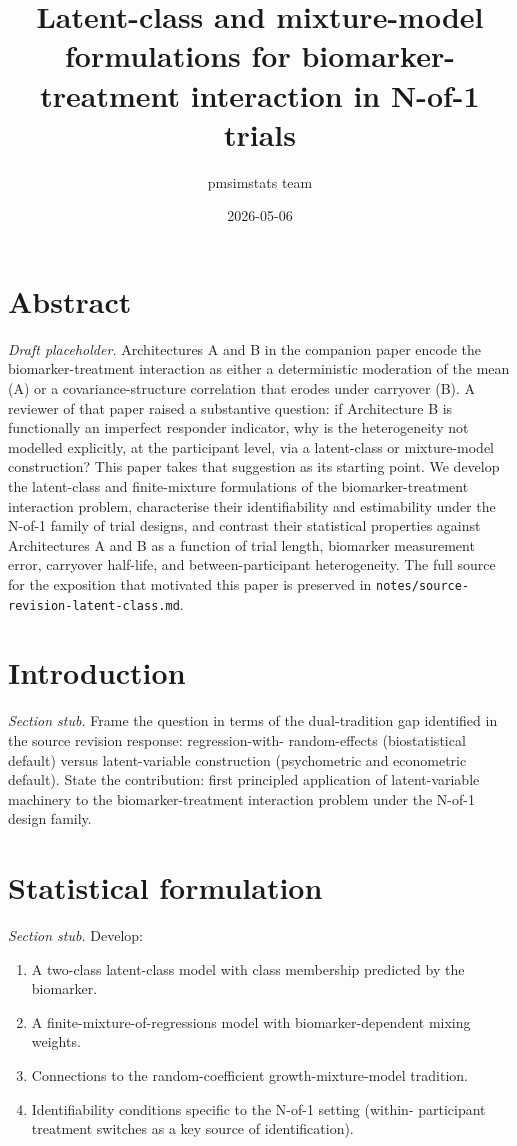 \documentclass[
]{article}
\title{Latent-class and mixture-model formulations for biomarker-treatment interaction in N-of-1 trials}
\author{pmsimstats team}
\date{2026-05-06}
\providecommand{\tightlist}{%
  \setlength{\itemsep}{0pt}\setlength{\parskip}{0pt}}
\begin{document}
\maketitle

\section{Abstract}\label{abstract}

\emph{Draft placeholder.} Architectures A and B in the companion paper
encode the biomarker-treatment interaction as either a deterministic
moderation of the mean (A) or a covariance-structure correlation that
erodes under carryover (B). A reviewer of that paper raised a
substantive question: if Architecture B is functionally an imperfect
responder indicator, why is the heterogeneity not modelled
explicitly, at the participant level, via a latent-class or
mixture-model construction? This paper takes that suggestion as its
starting point. We develop the latent-class and finite-mixture
formulations of the biomarker-treatment interaction problem,
characterise their identifiability and estimability under the
N-of-1 family of trial designs, and contrast their statistical
properties against Architectures A and B as a function of trial
length, biomarker measurement error, carryover half-life, and
between-participant heterogeneity. The full source for the
exposition that motivated this paper is preserved in
\texttt{notes/source-revision-latent-class.md}.

\section{Introduction}\label{introduction}

\emph{Section stub.} Frame the question in terms of the dual-tradition
gap identified in the source revision response: regression-with-
random-effects (biostatistical default) versus latent-variable
construction (psychometric and econometric default). State the
contribution: first principled application of latent-variable
machinery to the biomarker-treatment interaction problem under the
N-of-1 design family.

\section{Statistical formulation}\label{statistical-formulation}

\emph{Section stub.} Develop:

\begin{enumerate}
\def\labelenumi{\arabic{enumi}.}
\tightlist
\item
  A two-class latent-class model with class membership predicted by
  the biomarker.
\item
  A finite-mixture-of-regressions model with biomarker-dependent
  mixing weights.
\item
  Connections to the random-coefficient growth-mixture-model
  tradition.
\item
  Identifiability conditions specific to the N-of-1 setting (within-
  participant treatment switches as a key source of identification).
\end{enumerate}
\end{document}
